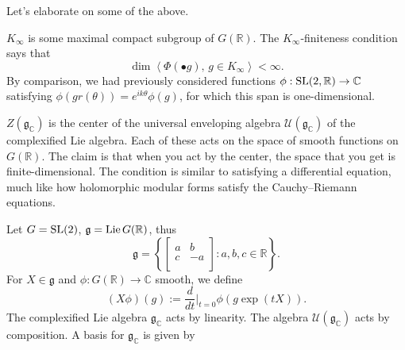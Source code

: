 \documentclass[reqno]{amsart} 
\begin{document}
Let's elaborate on some of the above.

$K_\infty$ is some maximal compact subgroup of $G(\mathbb{R})$.  The $K_\infty$-finiteness condition says that
\begin{equation*}
  \dim \left\langle \Phi(\bullet g), \, g \in K_\infty \right\rangle < \infty.
\end{equation*}
By comparison, we had previously considered functions $\phi : \operatorname{SL}(2, \mathbb{R}) \rightarrow \mathbb{C}$ satisfying $\phi(g r(\theta)) = e^{i k \theta} \phi(g)$, for which this span is one-dimensional.

$Z(\mathfrak{g}_{\mathbb{C}})$ is the center of the universal enveloping algebra $\mathcal{U}(\mathfrak{g}_{\mathbb{C}})$ of the complexified Lie algebra.  Each of these acts on the space of smooth functions on $G(\mathbb{R})$.  The claim is that when you act by the center, the space that you get is finite-dimensional.  The condition is similar to satisfying a differential equation, much like how holomorphic modular forms satisfy the Cauchy--Riemann equations.

Let $G = \operatorname{SL}(2)$, $\mathfrak{g} = \operatorname{Lie} G(\mathbb{R})$, thus
\begin{equation*}
  \mathfrak{g} = \left\{
    \begin{bmatrix}
      a      & b \\
      c & -a \\
    \end{bmatrix} : a,b,c \in \mathbb{R} \right\}.
\end{equation*}
For $X \in \mathfrak{g}$ and $\phi : G(\mathbb{R}) \rightarrow \mathbb{C}$ smooth, we define
\begin{equation*}
  (X \phi)(g) := \frac{d}{d t} |_{t=0}
  \phi(g \exp(t X)).
\end{equation*}
The complexified Lie algebra $\mathfrak{g}_{\mathbb{C}}$ acts by linearity.  The algebra $\mathcal{U}(\mathfrak{g}_{\mathbb{C}})$ acts by composition.   A basis for $\mathfrak{g}_{\mathbb{C}}$ is given by
\end{document}
